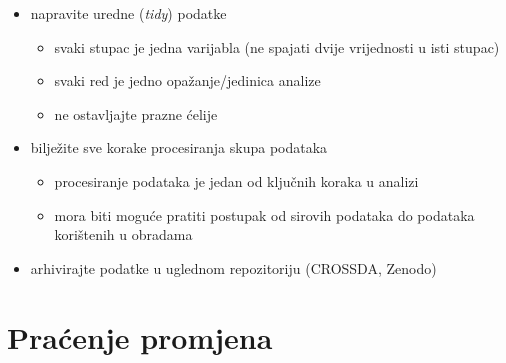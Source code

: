 \documentclass[aspectratio=169]{beamer}
\begin{document}
\begin{frame}
    \begin{itemize}
        \setlength{\itemsep}{2em}

        \item napravite uredne (\textit{tidy}) podatke

        \begin{itemize}
            \item svaki stupac je jedna varijabla (ne spajati dvije vrijednosti
                u isti stupac)

            \item svaki red je jedno opažanje/jedinica analize

            \item ne ostavljajte prazne ćelije
        \end{itemize}

        \pause

        \item bilježite sve korake procesiranja skupa podataka

        \pause

        \begin{itemize}
            \item procesiranje podataka je jedan od ključnih koraka u analizi

            \pause

            \item mora biti moguće pratiti postupak od sirovih podataka do
                podataka korištenih u obradama
        \end{itemize}

        \pause

        \item arhivirajte podatke u uglednom repozitoriju (CROSSDA, Zenodo)
    \end{itemize}
\end{frame}

\section{Praćenje promjena}
\end{document}
